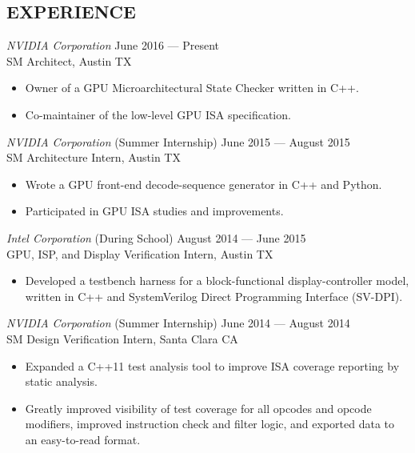\documentclass[margin]{res}
\begin{document}
\begin{resume}
  \section{EXPERIENCE}
  {\sl NVIDIA Corporation}
  \hfill June 2016 --- Present \\
  SM Architect, Austin TX
  \vspace{0.25em}
  \begin{itemize}
  \item Owner of a GPU Microarchitectural State Checker written in C++.
  \item Co-maintainer of the low-level GPU ISA specification.
  \end{itemize}
  \vspace{-.3em}
  {\sl NVIDIA Corporation}
  \hfill (Summer Internship) June 2015 --- August 2015 \\
  SM Architecture Intern, Austin TX
  \vspace{0.25em}
  \begin{itemize}
  \item Wrote a GPU front-end decode-sequence generator in C++ and Python.
  \item Participated in GPU ISA studies and improvements.
  \end{itemize}
  \vspace{-.3em}
  {\sl Intel Corporation}
  \hfill (During School) August 2014 --- June 2015 \\
  GPU, ISP, and Display Verification Intern, Austin TX
  \vspace{0.25em}
  \begin{itemize}
  \item Developed a testbench harness for a block-functional display-controller
    model, written in C++ and SystemVerilog Direct Programming Interface
    (SV-DPI).
  \end{itemize}
  \vspace{-.3em}
  {\sl NVIDIA Corporation}
  \hfill (Summer Internship) June 2014 --- August 2014 \\
  SM Design Verification Intern, Santa Clara CA
  \vspace{0.25em}
  \begin{itemize}
  \item Expanded a C++11 test analysis tool to improve ISA coverage reporting
    by static analysis.
  \item Greatly improved visibility of test coverage for all opcodes and opcode
    modifiers, improved instruction check and filter logic, and exported data to
    an easy-to-read format.
  \end{itemize}

\end{resume}
\end{document}

